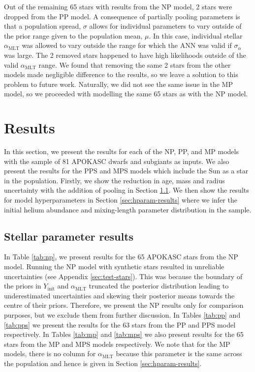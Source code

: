 \documentclass[fleqn,usenatbib]{mnras}
\newcommand{\mlt}{\ensuremath{{\alpha_\mathrm{MLT}}}}
\begin{document}
Out of the remaining 65 stars with results from the NP model, 2 stars were dropped from the PP model. A consequence of partially pooling parameters is that a population spread, $\sigma$ allows for individual parameters to vary outside of the prior range given to the population mean, $\mu$. In this case, individual stellar $\mlt$ was allowed to vary outside the range for which the ANN was valid if $\sigma_\alpha$ was large. The 2 removed stars happened to have high likelihoods outside of the valid $\mlt$ range. We found that removing the same 2 stars from the other models made negligible difference to the results, so we leave a solution to this problem to future work. Naturally, we did not see the same issue in the MP model, so we proceeded with modelling the same 65 stars as with the NP model.

\section{Results}\label{sec:res}



In this section, we present the results for each of the NP, PP, and MP models with the sample of 81 APOKASC dwarfs and subgiants as inputs. We also present the results for the PPS and MPS models which include the Sun as a star in the population. Firstly, we show the reduction in age, mass and radius uncertainty with the addition of pooling in Section \ref{sec:param-results}. We then show the results for model hyperparameters in Section \ref{sec:hparam-results} where we infer the initial helium abundance and mixing-length parameter distribution in the sample.

\subsection{Stellar parameter results}\label{sec:param-results}

In Table \ref{tab:np}, we present results for the 65 APOKASC stars from the NP model. Running the NP model with synthetic stars resulted in unreliable uncertainties (see Appendix \ref{sec:test-stars}). This was because the boundary of the priors in $Y_\mathrm{init}$ and $\mlt$ truncated the posterior distribution leading to underestimated uncertainties and skewing their posterior means towards the centre of their priors. Therefore, we present the NP results only for comparison purposes, but we exclude them from further discussion. In Tables \ref{tab:pp} and \ref{tab:pps} we present the results for the 63 stars from the PP and PPS model respectively. In Tables \ref{tab:mp} and \ref{tab:mps} we also present results for the 65 stars from the MP and MPS models respectively. We note that for the MP models, there is no column for $\mlt$ because this parameter is the same across the population and hence is given in Section \ref{sec:hparam-results}.
\end{document}
